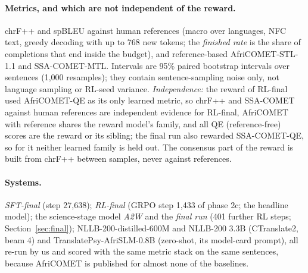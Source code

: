 \paragraph{Metrics, and which are not independent of the reward.} chrF++ \citep{popovic2017chrfpp} and spBLEU \citep{post2018call} against human references (macro over languages, NFC text, greedy decoding with up to 768 new tokens; the \emph{finished rate} is the share of completions that end inside the budget), and reference-based AfriCOMET-STL-1.1 and SSA-COMET-MTL. Intervals are 95\% paired bootstrap intervals over sentences (1,000 resamples); they contain sentence-sampling noise only, not language sampling or RL-seed variance. \emph{Independence:} the reward of RL-final used AfriCOMET-QE as its only learned metric, so chrF++ and SSA-COMET against human references are independent evidence for RL-final, AfriCOMET with reference shares the reward model's family, and all QE (reference-free) scores are the reward or its sibling; the final run also rewarded SSA-COMET-QE, so for it neither learned family is held out. The consensus part of the reward is built from chrF++ between samples, never against references.

\paragraph{Systems.} \emph{SFT-final} (step 27,638); \emph{RL-final} (GRPO step 1,433 of phase 2c; the headline model); the science-stage model \emph{A2W} and the \emph{final run} (401 further RL steps; Section~\ref{sec:final}); NLLB-200-distilled-600M and NLLB-200 3.3B (CTranslate2, beam 4) and TranslatePsy-AfriSLM-0.8B (zero-shot, its model-card prompt), all re-run by us and scored with the same metric stack on the same sentences, because AfriCOMET is published for almost none of the baselines.
